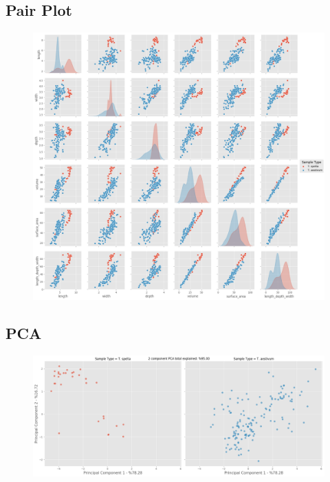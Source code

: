 \documentclass[11pt]{report}
\begin{document}
\subsection{Pair Plot}
\label{sec:org6b5647a}

\begin{figure}[htbp]
\centering
\includegraphics[width=18cm]{./images/results/group3/pairplot.png}
\label{fig:org5e8e6b9}
\end{figure}

\clearpage
\subsection{PCA}
\label{sec:org3cffc6f}
\begin{figure}[htbp]
\centering
\includegraphics[width=18cm]{./images/results/group3/pca.png}
\label{fig:org5fc7e92}
\end{figure}
\end{document}

